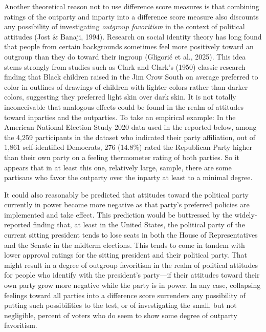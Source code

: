 \documentclass[authordate, meta, issue]{jote-new-article}
\begin{document}
	Another theoretical reason not to use difference score measures is that combining ratings of the outparty and inparty into a difference score measure also discounts any possibility of investigating \emph{outgroup favoritism} in the context of political attitudes (Jost \& Banaji, 1994). Research on social identity theory has long found that people from certain backgrounds sometimes feel more positively toward an outgroup than they do toward their ingroup (Gligorić et al., 2025). This idea stems strongly from studies such as Clark and Clark's (1950) classic research finding that Black children raised in the Jim Crow South on average preferred to color in outlines of drawings of children with lighter colors rather than darker colors, suggesting they preferred light skin over dark skin. It is not totally inconceivable that analogous effects could be found in the realm of attitudes toward inparties and the outparties. To take an empirical example: In the American National Election Study 2020 data used in the reported below, among the 4,259 participants in the dataset who indicated their party affiliation, out of 1,861 self-identified Democrats, 276 (14.8\%) rated the Republican Party higher than their own party on a feeling thermometer rating of both parties. So it appears that in at least this one, relatively large, sample, there are some partisans who favor the outparty over the inparty at least to a minimal degree.



	It could also reasonably be predicted that attitudes toward the political party currently in power become more negative as that party's preferred policies are implemented and take effect. This prediction would be buttressed by the widely-reported finding that, at least in the United States, the political party of the current sitting president tends to lose seats in both the House of Representatives and the Senate in the midterm elections. This tends to come in tandem with lower approval ratings for the sitting president and their political party. That might result in a degree of outgroup favoritism in the realm of political attitudes for people who identify with the president's party—if their attitudes toward their own party grow more negative while the party is in power. In any case, collapsing feelings toward all parties into a difference score surrenders any possibility of putting such possibilities to the test, or of investigating the small, but not negligible, percent of voters who do seem to show some degree of outparty favoritism.
\end{document}
